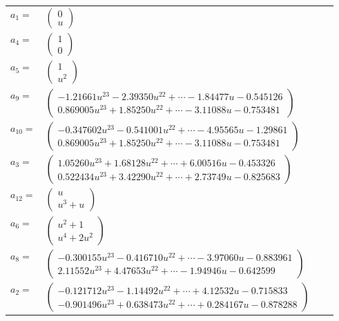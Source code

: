 \documentclass[1p]{elsarticle_modified}
\theoremstyle{definition}
\begin{document}
\begin{tabular}{m{7pt} m{180pt} m{7pt} m{180pt} }
\flushright $a_{1}=$&$\begin{pmatrix}0\\u\end{pmatrix}$ \\
\flushright $a_{4}=$&$\begin{pmatrix}1\\0\end{pmatrix}$ \\
\flushright $a_{5}=$&$\begin{pmatrix}1\\u^2\end{pmatrix}$ \\
\flushright $a_{9}=$&$\begin{pmatrix}-1.21661 u^{23}-2.39350 u^{22}+\cdots-1.84477 u-0.545126\\0.869005 u^{23}+1.85250 u^{22}+\cdots-3.11088 u-0.753481\end{pmatrix}$ \\
\flushright $a_{10}=$&$\begin{pmatrix}-0.347602 u^{23}-0.541001 u^{22}+\cdots-4.95565 u-1.29861\\0.869005 u^{23}+1.85250 u^{22}+\cdots-3.11088 u-0.753481\end{pmatrix}$ \\
\flushright $a_{3}=$&$\begin{pmatrix}1.05260 u^{23}+1.68128 u^{22}+\cdots+6.00516 u-0.453326\\0.522434 u^{23}+3.42290 u^{22}+\cdots+2.73749 u-0.825683\end{pmatrix}$ \\
\flushright $a_{12}=$&$\begin{pmatrix}u\\u^3+u\end{pmatrix}$ \\
\flushright $a_{6}=$&$\begin{pmatrix}u^2+1\\u^4+2 u^2\end{pmatrix}$ \\
\flushright $a_{8}=$&$\begin{pmatrix}-0.300155 u^{23}-0.416710 u^{22}+\cdots-3.97060 u-0.883961\\2.11552 u^{23}+4.47653 u^{22}+\cdots-1.94946 u-0.642599\end{pmatrix}$ \\
\flushright $a_{2}=$&$\begin{pmatrix}-0.121712 u^{23}-1.14492 u^{22}+\cdots+4.12532 u-0.715833\\-0.901496 u^{23}+0.638473 u^{22}+\cdots+0.284167 u-0.878288\end{pmatrix}$ \\

\end{tabular}
\end{document}
